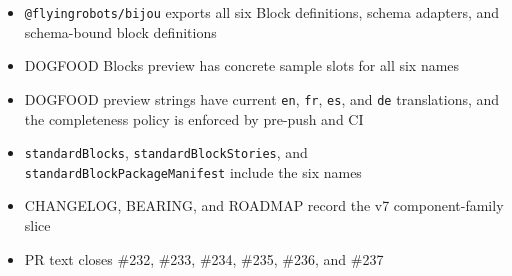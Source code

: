 \begin{itemize}
\tightlist
\item
  \texttt{@\allowbreak{}f\allowbreak{}l\allowbreak{}y\allowbreak{}i\allowbreak{}n\allowbreak{}g\allowbreak{}r\allowbreak{}o\allowbreak{}b\allowbreak{}o\allowbreak{}t\allowbreak{}s\allowbreak{}/\allowbreak{}b\allowbreak{}i\allowbreak{}j\allowbreak{}o\allowbreak{}u} exports all six Block definitions, schema adapters, and schema-bound block definitions
\item
  DOGFOOD Blocks preview has concrete sample slots for all six names
\item
  DOGFOOD preview strings have current \texttt{e\allowbreak{}n}, \texttt{f\allowbreak{}r}, \texttt{e\allowbreak{}s}, and \texttt{d\allowbreak{}e} translations, and the completeness policy is enforced by pre-push and CI
\item
  \texttt{s\allowbreak{}t\allowbreak{}a\allowbreak{}n\allowbreak{}d\allowbreak{}a\allowbreak{}r\allowbreak{}d\allowbreak{}B\allowbreak{}l\allowbreak{}o\allowbreak{}c\allowbreak{}k\allowbreak{}s}, \texttt{s\allowbreak{}t\allowbreak{}a\allowbreak{}n\allowbreak{}d\allowbreak{}a\allowbreak{}r\allowbreak{}d\allowbreak{}B\allowbreak{}l\allowbreak{}o\allowbreak{}c\allowbreak{}k\allowbreak{}S\allowbreak{}t\allowbreak{}o\allowbreak{}r\allowbreak{}i\allowbreak{}e\allowbreak{}s}, and \texttt{s\allowbreak{}t\allowbreak{}a\allowbreak{}n\allowbreak{}d\allowbreak{}a\allowbreak{}r\allowbreak{}d\allowbreak{}B\allowbreak{}l\allowbreak{}o\allowbreak{}c\allowbreak{}k\allowbreak{}P\allowbreak{}a\allowbreak{}c\allowbreak{}k\allowbreak{}a\allowbreak{}g\allowbreak{}e\allowbreak{}M\allowbreak{}a\allowbreak{}n\allowbreak{}i\allowbreak{}f\allowbreak{}e\allowbreak{}s\allowbreak{}t} include the six names
\item
  CHANGELOG, BEARING, and ROADMAP record the v7 component-family slice
\item
  PR text closes \#232, \#233, \#234, \#235, \#236, and \#237
\end{itemize}


